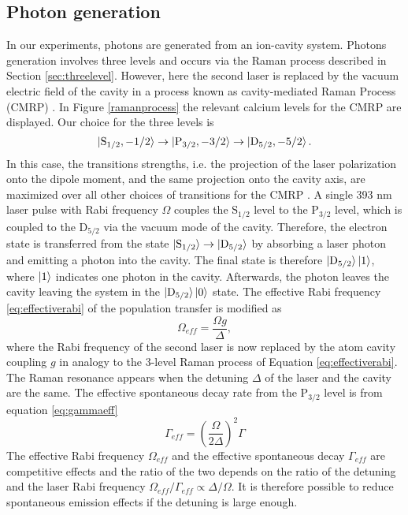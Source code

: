 \subsection{Photon generation}
\label{sec:ramanprocess}
In our experiments, photons are generated from an ion-cavity system. Photons generation involves three levels and occurs via the Raman process described in Section \ref{sec:threelevel}. However, here the second laser is replaced by the vacuum electric field of the cavity in a process known as cavity-mediated Raman Process (CMRP) \cite{stuteinterface}. In Figure \ref{ramanprocess} the relevant calcium levels for the CMRP are displayed. Our choice for the three levels is
\begin{equation}
\ket{\text{S}_{1/2},-1/2}\to\ket{\text{P}_{3/2},-3/2} \to \ket{\text{D}_{5/2},-5/2}.
\end{equation}
In this case, the transitions strengths, i.e. the projection of the laser polarization onto the dipole moment, and the same projection onto the cavity axis, are maximized over all other choices of transitions for the CMRP \cite{stuteinterface}. A single 393 nm laser pulse with Rabi frequency $\Omega$ couples the $\text{S}_{1/2}$ level to the $\text{P}_{3/2}$ level, which is coupled to the $\text{D}_{5/2}$ via the vacuum mode of the cavity. Therefore, the electron state is transferred from the state $\ket{\text{S}_{1/2}} \to \ket{\text{D}_{5/2}}$  by absorbing a laser photon and emitting a photon into the cavity. The final state is therefore $\ket{\text{D}_{5/2}}\ket{1}$, where $\ket{1}$ indicates one photon in the cavity. Afterwards, the photon leaves the cavity leaving the system in the $\ket{\text{D}_{5/2}}\ket{0}$ state. The effective Rabi frequency \eqref{eq:effectiverabi} of the population transfer is modified as \cite{Barros2009}
\begin{equation}
\label{omegaeff}
\Omega_{eff} = \frac{\Omega g}{\Delta},
\end{equation}
where the Rabi frequency of the second laser is now replaced by the atom cavity coupling $g$ in analogy to the 3-level Raman process of Equation \eqref{eq:effectiverabi}. The Raman resonance appears when the detuning $\Delta$ of the laser and the cavity are the same. The effective spontaneous decay rate from the $\text{P}_{3/2}$ level is from equation \eqref{eq:gammaeff}
\begin{equation}
\label{gammaeff}
\Gamma_{eff} = \left(\frac{\Omega}{2\Delta}\right)^2\Gamma
\end{equation}
The effective Rabi frequency $\Omega_{eff}$ and the effective spontaneous decay $\Gamma_{eff}$ are competitive effects and the ratio of the two depends on the ratio of the detuning and the laser Rabi frequency $\Omega_{eff}/\Gamma_{eff} \propto \Delta/\Omega$. It is therefore possible to reduce spontaneous emission effects if the detuning is large enough.\par

